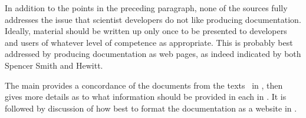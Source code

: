In addition to the points in the preceding paragraph, none of the sources fully addresses the issue
that scientist developers do not like producing documentation. Ideally, material should be written up
only once to be presented to developers and users of whatever level of competence as appropriate. This
is probably best addressed by producing documentation as web pages, as indeed indicated by both Spencer Smith
and Hewitt.

The main  provides a concordance of the documents from the
texts~\cite{hewitt, Sm17Rati, sommerville10} in , then gives more details
as to what information should be provided in each in . It is followed by
discussion of how best to format the documentation as a website in .



